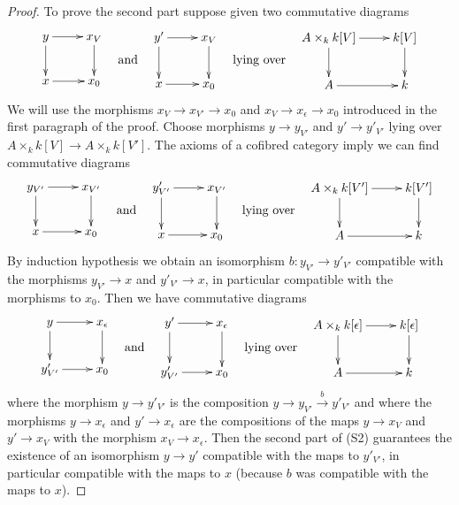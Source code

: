 \documentclass[10pt,a4paper]{amsart}
\theoremstyle{plain}
\theoremstyle{definition}
\theoremstyle{remark}
\numberwithin{equation}{subsection}
\begin{document}
\begin{proof}
\medskip\noindent
To prove the second part suppose given two commutative
diagrams
$$
\vcenter{
\xymatrix{
y \ar[r] \ar[d] & x_V \ar[d] \\
x \ar[r] & x_0
}
}
\quad\text{and}\quad
\vcenter{
\xymatrix{
y' \ar[r] \ar[d] & x_V \ar[d] \\
x \ar[r] & x_0
}
}
\quad\text{lying over}\quad
\vcenter{
\xymatrix{
A \times_k k[V] \ar[d] \ar[r] & k[V] \ar[d] \\
A \ar[r] & k
}
}
$$
We will use the morphisms $x_V \to x_{V'} \to x_0$ and
$x_V \to x_\epsilon \to x_0$ introduced in the first paragraph of the proof.
Choose morphisms $y \to y_{V'}$ and $y' \to y'_{V'}$
lying over $A \times_k k[V] \to A \times_k k[V']$. The axioms of a
cofibred category imply we can find commutative diagrams
$$
\vcenter{
\xymatrix{
y_{V'} \ar[r] \ar[d] & x_{V'} \ar[d] \\
x \ar[r] & x_0
}
}
\quad\text{and}\quad
\vcenter{
\xymatrix{
y'_{V'} \ar[r] \ar[d] & x_{V'} \ar[d] \\
x \ar[r] & x_0
}
}
\quad\text{lying over}\quad
\vcenter{
\xymatrix{
A \times_k k[V'] \ar[d] \ar[r] & k[V'] \ar[d] \\
A \ar[r] & k
}
}
$$
By induction hypothesis we obtain an isomorphism
$b : y_{V'} \to y'_{V'}$
compatible with the morphisms $y_{V'} \to x$ and $y'_{V'} \to x$,
in particular compatible with the morphisms to $x_0$.
Then we have commutative diagrams
$$
\vcenter{
\xymatrix{
y \ar[r] \ar[d] & x_\epsilon \ar[d] \\
y'_{V'} \ar[r] & x_0
}
}
\quad\text{and}\quad
\vcenter{
\xymatrix{
y' \ar[r] \ar[d] & x_\epsilon \ar[d] \\
y'_{V'} \ar[r] & x_0
}
}
\quad\text{lying over}\quad
\vcenter{
\xymatrix{
A \times_k k[\epsilon] \ar[d] \ar[r] & k[\epsilon] \ar[d] \\
A \ar[r] & k
}
}
$$
where the morphism $y \to y'_{V'}$ is the composition
$y \to y_{V'} \xrightarrow{b} y'_{V'}$ and where the morphisms
$y \to x_\epsilon$ and $y' \to x_\epsilon$ are the compositions of
the maps $y \to x_V$ and $y' \to x_V$ with the morphism $x_V \to x_\epsilon$.
Then the second part of (S2) guarantees the existence of an isomorphism
$y \to y'$ compatible with the maps to $y'_{V'}$, in particular compatible
with the maps to $x$ (because $b$ was compatible with the maps to $x$).
\end{proof}
\end{document}
